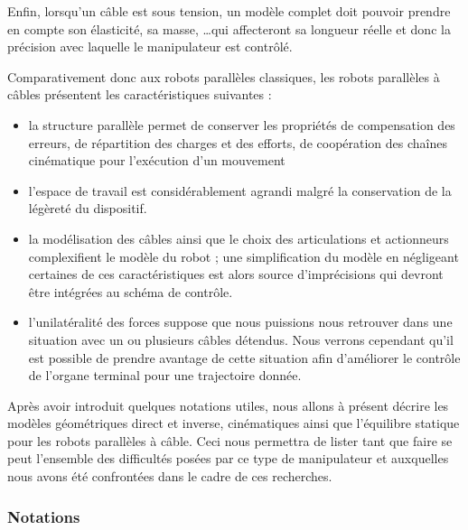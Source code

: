 Enfin, lorsqu'un câble est sous tension, un modèle complet doit pouvoir prendre en compte son élasticité, sa masse, \dots qui affecteront sa longueur réelle et donc la précision avec laquelle le manipulateur est contrôlé.

Comparativement donc aux robots parallèles classiques, les robots parallèles à câbles présentent les caractéristiques suivantes :
\begin{itemize}
 \item la structure parallèle permet de conserver les propriétés de compensation des erreurs, de répartition des charges et des efforts, de coopération des chaînes cinématique pour l'exécution d'un mouvement
 \item l'espace de travail est considérablement agrandi malgré la conservation de la légèreté du dispositif.
 \item la modélisation des câbles ainsi que le choix des articulations et actionneurs complexifient le modèle du robot ; une simplification du modèle en négligeant certaines de ces caractéristiques est alors source d'imprécisions qui devront être intégrées au schéma de contrôle.
 \item l'unilatéralité des forces suppose que nous puissions nous retrouver dans une situation avec un ou plusieurs câbles détendus. Nous verrons cependant qu'il est possible de prendre avantage de cette situation afin d'amélio\-rer le contrôle de l'organe terminal pour une trajectoire donnée.
\end{itemize}

Après avoir introduit quelques notations utiles, nous allons à présent décrire les modèles géométriques direct et inverse, cinématiques ainsi que l'équilibre statique pour les robots parallèles à câble. Ceci nous permettra de lister tant que faire se peut l'ensemble des difficultés posées par ce type de manipulateur et auxquelles nous avons été confrontées dans le cadre de ces recherches.

\subsubsection{Notations}


